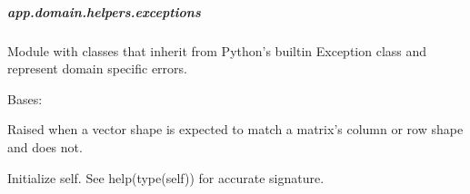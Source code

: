 \documentclass[letterpaper,10pt,english]{sphinxmanual}
\begin{document}
\subparagraph{app.domain.helpers.exceptions}
\label{\detokenize{app.domain.helpers:module-app.domain.helpers.exceptions}}\label{\detokenize{app.domain.helpers:app-domain-helpers-exceptions}}
Module with classes that inherit from Python’s builtin Exception class
and represent domain specific errors.

\begin{fulllineitems}
\label{\detokenize{app.domain.helpers:app.domain.helpers.exceptions.DistributionShapeError}}
Bases: 

Raised when a vector shape is expected to match a matrix’s column or
row shape and does not.

\begin{fulllineitems}
\label{\detokenize{app.domain.helpers:app.domain.helpers.exceptions.DistributionShapeError.__init__}}
Initialize self.  See help(type(self)) for accurate signature.

\end{fulllineitems}


\end{fulllineitems}

\end{document}
